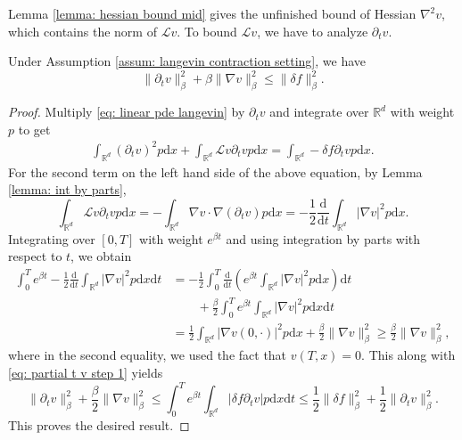 \documentclass[twoside,11pt]{article}
\newcommand{\dd}{\mathrm{d}}
\newcommand{\R}{\mathbb{R}}
\newcommand{\1}{\mathbf{1}}
\newcommand{\cL}{\mathcal{L}}
\numberwithin{equation}{section}
\begin{document}
Lemma \ref{lemma: hessian bound mid} gives the unfinished bound of Hessian $ \nabla^2 v$, which contains the norm of $ \cL v$. To bound $ \cL v$, we have to analyze $ \partial_t v$.

\begin{lemma}\label{lemma: partial t bound}
    Under Assumption \ref{assum: langevin contraction setting}, we have
    \begin{equation}
        \|\partial_t v\|_{\beta}^2 + \beta\|\nabla v\|_{\beta}^2 \le \|\delta f\|_{\beta}^2.
    \end{equation}
\end{lemma}
\begin{proof}
    Multiply \eqref{eq: linear pde langevin} by $\partial_t v$ and integrate over $\mathbb{R}^d$ with weight $p$ to get
    \begin{equation}\label{eq: partial t v step 1}
        \begin{aligned}
            \int_{\R^d} (\partial_t v)^2 p \dd x + \int_{\R^d} \cL v \partial_t v p \dd x = \int_{\R^d} -\delta f\partial_t vp \dd x.
        \end{aligned}
    \end{equation}
    For the second term on the left hand side of the above equation, by Lemma \ref{lemma: int by parts},
    \begin{equation}
        \int_{\R^d} \cL v \partial_t v p \dd x = -\int_{\R^d} \nabla v \cdot \nabla (\partial_t v) p\dd x = -\frac{1}{2}\frac{\dd }{\dd t}\int_{\R^d} |\nabla v|^2 p\dd x.
    \end{equation}
    Integrating over $ [0,T]$ with weight $ e^{\beta t}$ and using integration by parts with respect to $ t$, we obtain
    \begin{equation}
    \begin{aligned}
        \int_0^T e^{\beta t} -\frac{1}{2}\frac{\dd }{\dd t}\int_{\R^d} |\nabla v|^2 p\dd x \dd t &= -\frac{1}{2} \int_0^T \frac{\dd }{\dd t}\left(e^{\beta t} \int_{\R^d} |\nabla v|^2 p\dd x\right) \dd t \\
        &\qquad+ \frac{\beta}{2}\int_0^T   e^{\beta t} \int_{\R^d} |\nabla v|^2 p\dd x  \dd t\\
        & = \frac{1}{2}\int_{\R^d} |\nabla v(0,\cdot)|^2 p\dd x + \frac{\beta}{2}\|\nabla v\|_{\beta}^2 \ge \frac{\beta}{2}\|\nabla v\|_{\beta}^2,
        \end{aligned}
    \end{equation}
    where in the second equality, we used the fact that $ v(T,x) = 0$. This along with \eqref{eq: partial t v step 1} yields
    \begin{equation}
        \|\partial_t v\|_{\beta}^2 + \frac{\beta}{2}\|\nabla v\|_{\beta}^2 \le \int_0^T e^{\beta t}\int_{\R^d} |\delta f \partial_t v| p \dd x\dd t \le \frac{1}{2}\|\delta f\|_{\beta}^2 + \frac{1}{2} \|\partial_t v\|_{\beta}^{2}.
    \end{equation}
    This proves the desired result.
\end{proof}
\end{document}
